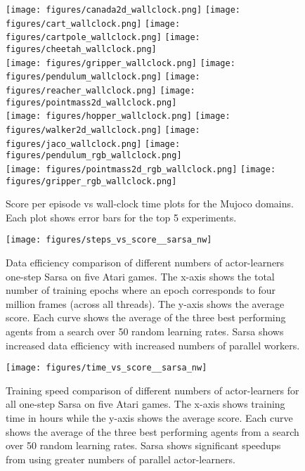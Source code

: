 \documentclass{article} \usepackage{times}
\begin{document}
\begin{figure}[t]
    \texttt{[image: figures/canada2d\_wallclock.png]}
    \texttt{[image: figures/cart\_wallclock.png]}
    \texttt{[image: figures/cartpole\_wallclock.png]}
    \texttt{[image: figures/cheetah\_wallclock.png]}\\
    \texttt{[image: figures/gripper\_wallclock.png]}
    \texttt{[image: figures/pendulum\_wallclock.png]}
    \texttt{[image: figures/reacher\_wallclock.png]}
    \texttt{[image: figures/pointmass2d\_wallclock.png]}\\
    \texttt{[image: figures/hopper\_wallclock.png]}
    \texttt{[image: figures/walker2d\_wallclock.png]}
    \texttt{[image: figures/jaco\_wallclock.png]}
    \texttt{[image: figures/pendulum\_rgb\_wallclock.png]}\\
    \texttt{[image: figures/pointmass2d\_rgb\_wallclock.png]}
    \texttt{[image: figures/gripper\_rgb\_wallclock.png]}
    \caption{\label{fig-mujoco-wallclock} Score per episode vs wall-clock time
    plots for the Mujoco domains. Each plot shows error bars for the top 5 experiments.}
\end{figure}

\begin{figure}
\centerline{\texttt{[image: figures/steps\_vs\_score\_\_sarsa\_nw]}}
\caption{\label{fig-scalability-data-sarsa} Data efficiency comparison of different numbers of actor-learners one-step Sarsa on five Atari games. The x-axis shows the total number of training epochs where an epoch corresponds to four million frames (across all threads).  The y-axis shows the average score. Each curve shows the average of the three best performing agents from a search over 50 random learning rates. Sarsa shows increased data efficiency with increased numbers of parallel workers.}
\end{figure}

\begin{figure}
\centerline{\texttt{[image: figures/time\_vs\_score\_\_sarsa\_nw]}}
\caption{\label{fig-scalability-time-sarsa} Training speed comparison of different numbers of actor-learners for all one-step Sarsa on five Atari games. The x-axis shows training time in hours while the y-axis shows the average score.  Each curve shows the average of the three best performing agents from a search over 50 random learning rates.  Sarsa shows significant speedups from using greater numbers of parallel actor-learners.}
\end{figure}
\end{document}
